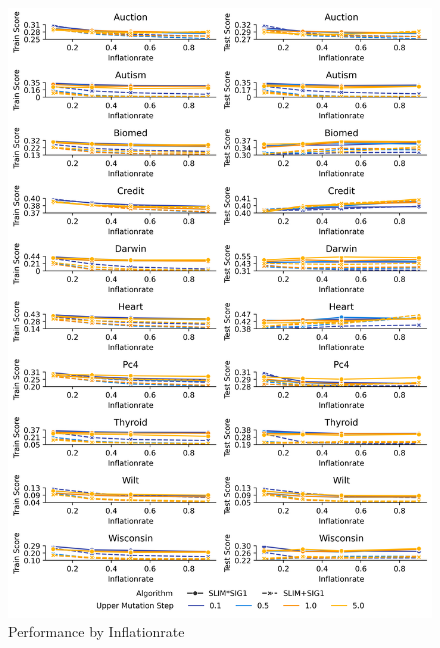 
    \begin{figure}[H]
    \centering
    \includegraphics[width=\linewidth]{../Latex/Chapters/Figures/Results/RQ_Inflationrate_performance_by_p_inflate.png}
    \caption{Performance by Inflationrate}
    \label{fig:RQ_Inflationrate_performance_by_p_inflate}
    \end{figure}
    